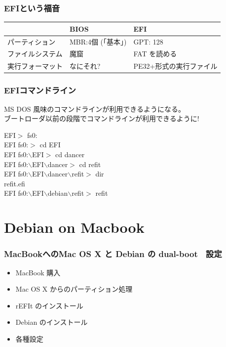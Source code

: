\documentclass[cjk,dvipdfmx]{beamer}
\begin{document}
\begin{frame}
\frametitle{EFIという福音}

\begin{tabular}[t]{|p{8em}|p{8em}|p{8em}|}
\hline
 & BIOS & EFI \\
\hline
パーティション & MBR:4個 (「基本」) & GPT: 128 \\
\hline
ファイルシステム & 魔窟 & FAT を読める \\
\hline
実行フォーマット & なにそれ? & PE32+形式の実行ファイル\\
\hline
\end{tabular}
\end{frame}


\begin{frame}
\frametitle{EFIコマンドライン}

MS DOS 風味のコマンドラインが利用できるようになる。\\
ブートローダ以前の段階でコマンドラインが利用できるように!

EFI$>$ fs0:\\
EFI fs0:$>$ cd EFI\\
EFI fs0:$\backslash{}$EFI$>$ cd dancer\\
EFI fs0:$\backslash{}$EFI$\backslash{}$dancer$>$ cd refit\\
EFI fs0:$\backslash{}$EFI$\backslash{}$dancer$\backslash{}$refit$>$ dir\\
refit.efi\\
 EFI fs0:$\backslash{}$EFI$\backslash{}$debian$\backslash{}$refit$>$ refit

\end{frame}

\section{Debian on Macbook}

\begin{frame}
 \frametitle{MacBookへのMac OS X と Debian の dual-boot　設定}
 \begin{minipage}{0.5\hsize}
  \begin{itemize}
   \item MacBook 購入
   \item Mac OS X からのパーティション処理
   \item rEFIt のインストール
   \item Debian のインストール
   \item 各種設定
  \end{itemize}
 \end{minipage}
\end{frame}
\end{document}
